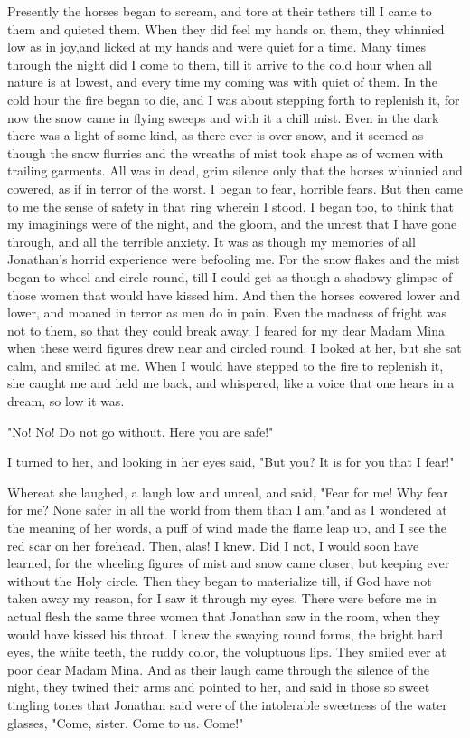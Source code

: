 Presently the horses began to scream, and tore at their tethers till I came to them and quieted them. When they did feel my hands on them, they whinnied low as in joy,and licked at my hands and were quiet for a time. Many times through the night did I come to them, till it arrive to the cold hour when all nature is at lowest, and every time my coming was with quiet of them. In the cold hour the fire began to die, and I was about stepping forth to replenish it, for now the snow came in flying sweeps and with it a chill mist. Even in the dark there was a light of some kind, as there ever is over snow, and it seemed as though the snow flurries and the wreaths of mist took shape as of women with trailing garments. All was in dead, grim silence only that the horses whinnied and cowered, as if in terror of the worst. I began to fear, horrible fears. But then came to me the sense of safety in that ring wherein I stood. I began too, to think that my imaginings were of the night, and the gloom, and the unrest that I have gone through, and all the terrible anxiety. It was as though my memories of all Jonathan's horrid experience were befooling me. For the snow flakes and the mist began to wheel and circle round, till I could get as though a shadowy glimpse of those women that would have kissed him. And then the horses cowered lower and lower, and moaned in terror as men do in pain. Even the madness of fright was not to them, so that they could break away. I feared for my dear Madam Mina when these weird figures drew near and circled round. I looked at her, but she sat calm, and smiled at me. When I would have stepped to the fire to replenish it, she caught me and held me back, and whispered, like a voice that one hears in a dream, so low it was. 

"No! No! Do not go without. Here you are safe!" 

I turned to her, and looking in her eyes said, "But you? It is for you that I fear!" 

Whereat she laughed, a laugh low and unreal, and said, "Fear for me! Why fear for me? None safer in all the world from them than I am,"and as I wondered at the meaning of her words, a puff of wind made the flame leap up, and I see the red scar on her forehead. Then, alas! I knew. Did I not, I would soon have learned, for the wheeling figures of mist and snow came closer, but keeping ever without the Holy circle. Then they began to materialize till, if God have not taken away my reason, for I saw it through my eyes. There were before me in actual flesh the same three women that Jonathan saw in the room, when they would have kissed his throat. I knew the swaying round forms, the bright hard eyes, the white teeth, the ruddy color, the voluptuous lips. They smiled ever at poor dear Madam Mina. And as their laugh came through the silence of the night, they twined their arms and pointed to her, and said in those so sweet tingling tones that Jonathan said were of the intolerable sweetness of the water glasses, "Come, sister. Come to us. Come!" 

